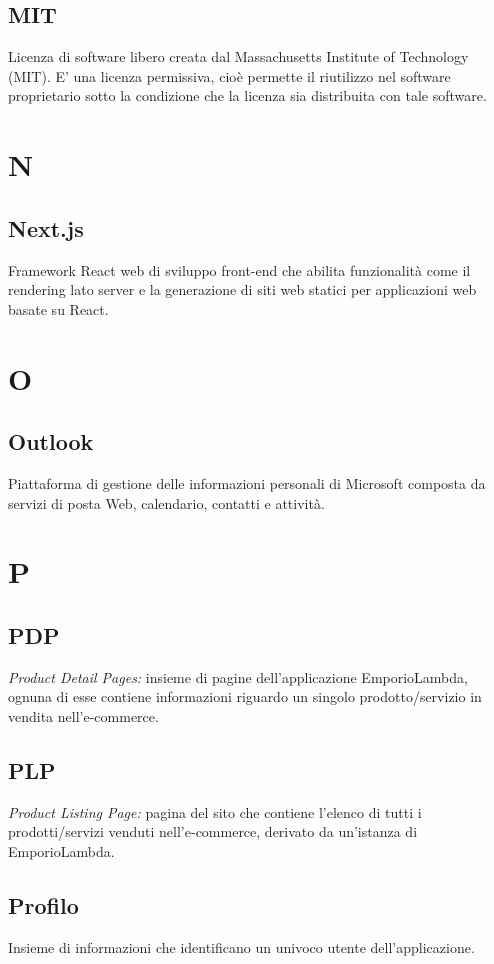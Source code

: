 \subsection*{MIT}
Licenza di software libero creata dal Massachusetts Institute of Technology (MIT).
E' una licenza permissiva, cioè permette il riutilizzo nel software proprietario sotto la condizione che la licenza sia distribuita con tale software.

\section*{N}

\subsection*{Next.js}
Framework React web di sviluppo front-end che abilita funzionalità come il rendering lato server e la generazione di siti web statici per applicazioni web basate su React.

\section*{O}
\subsection*{Outlook}
Piattaforma di gestione delle informazioni personali di Microsoft composta da servizi di posta Web, calendario, contatti e attività.

\section*{P}
\subsection*{PDP}
\textit{Product Detail Pages:} insieme di pagine dell'applicazione EmporioLambda, ognuna di esse contiene informazioni
riguardo un singolo prodotto/servizio in vendita nell'e-commerce.

\subsection*{PLP}
\textit{Product Listing Page:} pagina del sito che contiene l'elenco di tutti i prodotti/servizi venduti
nell'e-commerce, derivato da un'istanza di EmporioLambda.

\subsection*{Profilo}
Insieme di informazioni che identificano un univoco utente dell'applicazione.

